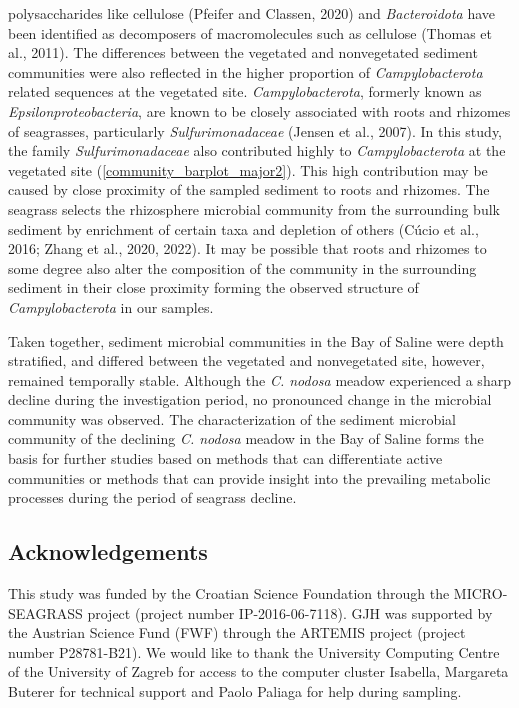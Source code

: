 \documentclass[12pt,]{article}
\begin{document}
polysaccharides like cellulose (Pfeifer and Classen, 2020) and
\emph{Bacteroidota} have been identified as decomposers of
macromolecules such as cellulose (Thomas et al., 2011). The differences
between the vegetated and nonvegetated sediment communities were also
reflected in the higher proportion of \emph{Campylobacterota} related
sequences at the vegetated site. \emph{Campylobacterota}, formerly known
as \emph{Epsilonproteobacteria}, are known to be closely associated with
roots and rhizomes of seagrasses, particularly \emph{Sulfurimonadaceae}
(Jensen et al., 2007). In this study, the family
\emph{Sulfurimonadaceae} also contributed highly to
\emph{Campylobacterota} at the vegetated site
(\autoref {community_barplot_major2}). This high contribution may be
caused by close proximity of the sampled sediment to roots and rhizomes.
The seagrass selects the rhizosphere microbial community from the
surrounding bulk sediment by enrichment of certain taxa and depletion of
others (Cúcio et al., 2016; Zhang et al., 2020, 2022). It may be
possible that roots and rhizomes to some degree also alter the
composition of the community in the surrounding sediment in their close
proximity forming the observed structure of \emph{Campylobacterota} in
our samples.

Taken together, sediment microbial communities in the Bay of Saline were
depth stratified, and differed between the vegetated and nonvegetated
site, however, remained temporally stable. Although the \emph{C. nodosa}
meadow experienced a sharp decline during the investigation period, no
pronounced change in the microbial community was observed. The
characterization of the sediment microbial community of the declining
\emph{C. nodosa} meadow in the Bay of Saline forms the basis for further
studies based on methods that can differentiate active communities or
methods that can provide insight into the prevailing metabolic processes
during the period of seagrass decline.

\newpage

\hypertarget{acknowledgements}{%
\subsection{Acknowledgements}\label{acknowledgements}}

This study was funded by the Croatian Science Foundation through the
MICRO-SEAGRASS project (project number IP-2016-06-7118). GJH was
supported by the Austrian Science Fund (FWF) through the ARTEMIS project
(project number P28781-B21). We would like to thank the University
Computing Centre of the University of Zagreb for access to the computer
cluster Isabella, Margareta Buterer for technical support and Paolo
Paliaga for help during sampling.
\end{document}
